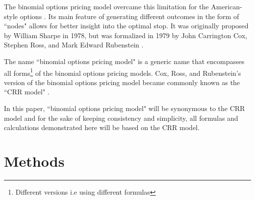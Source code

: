 \documentclass[12pt, letterpaper]{article}\usepackage{float}
\begin{document}
\medskip

The binomial options pricing model overcame this limitation for the American-style options \cite{bopmwikipedia}.
Its main feature of generating different outcomes in the form of ``nodes" allows for better insight into the optimal stop.
It was originally proposed by William Sharpe in 1978, but was formalized in 1979 by John Carrington Cox, Stephen Ross, and Mark Edward Rubenstein \cite{bopmwikipedia}.

\medskip

The name ``binomial options pricing model" is a generic name that encompasses all forms\footnote{Different versions i.e using different formulas} of the binomial options pricing models.
Cox, Ross, and Rubenstein's version of the binomial options pricing model became commonly known as the ``CRR model" \cite{thebinomialmodelcornell}.

\medskip

In this paper, ``binomial options pricing model" will be synonymous to the CRR model and for the sake of keeping consistency and simplicity, all formulas and calculations demonstrated here will be based on the CRR model.

\pagebreak

\section*{Methods}
\end{document}
